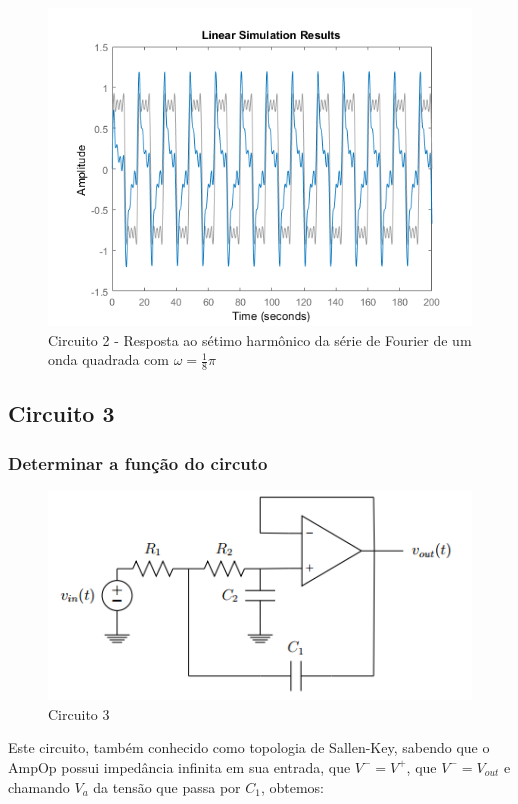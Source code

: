 \documentclass[a4paper, 12pt]{article}
\begin{document}
			\begin{figure}[!ht]
				\centering
				\includegraphics[scale=0.71]{img/1m_circ2.png}
				\caption{Circuito 2 - Resposta ao sétimo harmônico da série de Fourier de um onda quadrada com $\omega = \frac{1}{8}\pi$}	
			\end{figure}			
		\subsection{Circuito 3}
			\subsubsection{Determinar a função do circuto}
			\begin{figure}[!ht]
				\centering
				\includegraphics{img/circuito3.png}
				\caption{Circuito 3}	
			\end{figure}			
			
			Este circuito, também conhecido como topologia de Sallen-Key, sabendo que o AmpOp possui impedância infinita em sua entrada, que $V^{-} = V^{+}$, que $V^{-} = V_{out}$ e chamando $V_{a}$ da tensão que passa por $C_{1}$, obtemos:
				
\end{document}
